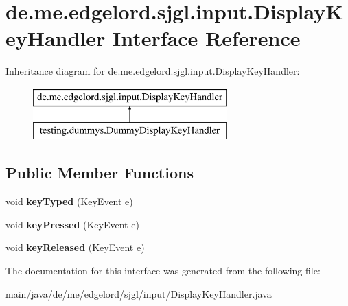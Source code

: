 \hypertarget{interfacede_1_1me_1_1edgelord_1_1sjgl_1_1input_1_1_display_key_handler}{}\section{de.\+me.\+edgelord.\+sjgl.\+input.\+Display\+Key\+Handler Interface Reference}
\label{interfacede_1_1me_1_1edgelord_1_1sjgl_1_1input_1_1_display_key_handler}
Inheritance diagram for de.\+me.\+edgelord.\+sjgl.\+input.\+Display\+Key\+Handler\+:\begin{figure}[H]
\begin{center}
\leavevmode
\includegraphics[height=2.000000cm]{interfacede_1_1me_1_1edgelord_1_1sjgl_1_1input_1_1_display_key_handler}
\end{center}
\end{figure}
\subsection*{Public Member Functions}
\begin{DoxyCompactItemize}
\item 
\mbox{\label{interfacede_1_1me_1_1edgelord_1_1sjgl_1_1input_1_1_display_key_handler_ab8b80e913dd3ac52a964c98b516f4a46}} 
void {\bfseries key\+Typed} (Key\+Event e)
\item 
\mbox{\label{interfacede_1_1me_1_1edgelord_1_1sjgl_1_1input_1_1_display_key_handler_adf48a33e4b11c291c4e09b90f44473fd}} 
void {\bfseries key\+Pressed} (Key\+Event e)
\item 
\mbox{\label{interfacede_1_1me_1_1edgelord_1_1sjgl_1_1input_1_1_display_key_handler_aa4ae3c899f7f6e83dab140b6799be18f}} 
void {\bfseries key\+Released} (Key\+Event e)
\end{DoxyCompactItemize}


The documentation for this interface was generated from the following file\+:\begin{DoxyCompactItemize}
\item 
main/java/de/me/edgelord/sjgl/input/Display\+Key\+Handler.\+java\end{DoxyCompactItemize}
